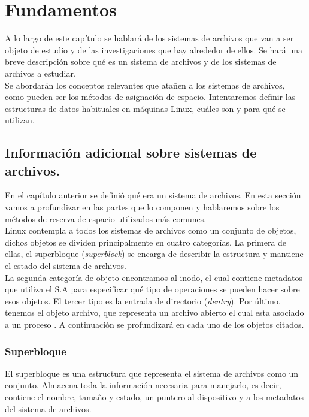 \cleardoublepage
\clearpage{}

\chapter[Fundamentos]{Fundamentos}
A lo largo de este capítulo se hablará de los sistemas de archivos que van a ser objeto de estudio y de las investigaciones que hay alrededor de ellos. Se hará una breve descripción sobre qué es un sistema de archivos y de los sistemas de archivos a estudiar.\\


Se abordarán los conceptos relevantes que atañen a los sistemas de archivos, como pueden ser los métodos de asignación de espacio. Intentaremos definir las estructuras de datos habituales en máquinas Linux, cuáles son y para qué se utilizan. 


\section{Información adicional sobre sistemas de archivos.}
En el capítulo anterior se definió qué era un sistema de archivos. En esta sección vamos a profundizar en las partes que lo componen y hablaremos sobre los métodos de reserva de espacio utilizados más comunes.\\

Linux contempla a todos los sistemas de archivos como un conjunto de objetos, dichos objetos se dividen principalmente en cuatro categorías. La primera de ellas, el superbloque (\textit{superblock}) se encarga de describir la estructura y mantiene el estado del sistema de archivos.\\


 La segunda categoría de objeto encontramos al inodo, el cual contiene metadatos que utiliza el S.A para especificar qué tipo de operaciones se pueden hacer sobre esos objetos. El tercer tipo es la entrada de directorio (\textit{dentry}). Por último, tenemos el objeto archivo, que representa un archivo abierto el cual esta asociado a un proceso \cite{jones_2007}. A continuación se profundizará en cada uno de los objetos citados.\\


\subsection{Superbloque}
El superbloque es una estructura que representa el sistema de archivos como un conjunto. Almacena toda la información necesaria para manejarlo, es decir, contiene el nombre, tamaño y estado, un puntero al dispositivo y a los metadatos del sistema de archivos.

